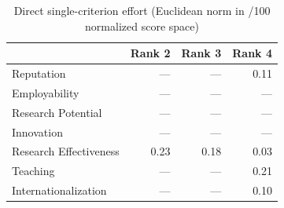 \begin{table}[htbp]
\centering
\caption{Direct single-criterion effort (Euclidean norm in /100 normalized score space)}
\label{tab:e1-direct}
\begin{tabular}{lrrr}
\toprule
 & Rank 2 & Rank 3 & Rank 4 \\
\midrule
Reputation & — & — & 0.11 \\
Employability & — & — & — \\
Research Potential & — & — & — \\
Innovation & — & — & — \\
Research Effectiveness & 0.23 & 0.18 & 0.03 \\
Teaching & — & — & 0.21 \\
Internationalization & — & — & 0.10 \\
\bottomrule
\end{tabular}
\end{table}
